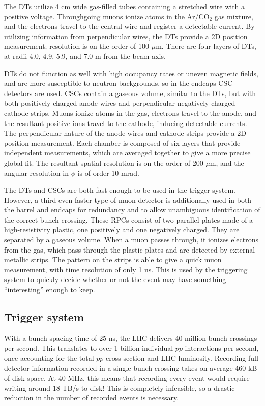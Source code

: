 The DTs utilize 4 cm wide gas-filled tubes containing a 
stretched wire with a positive voltage.
Throughgoing muons ionize atoms in the Ar/CO$_2$ gas mixture, and the electrons
travel to the central wire and register a detectable current.
By utilizing information from perpendicular wires, 
the DTs provide a 2D position measurement; resolution is on
the order of 100 $\mu$m.
There are four layers of DTs, at radii 4.0, 4.9, 5.9, and 7.0 m from
the beam axis.

DTs do not function as well with high occupancy rates or uneven magnetic fields,
and are more susceptible to neutron backgrounds, so in the endcaps
CSC detectors are used. CSCs contain a gaseous volume, similar to the DTs, but
with both positively-charged anode wires and perpendicular negatively-charged
cathode strips. Muons ionize atoms in the gas, electrons travel to the anode,
and the resultant positive ions travel to the cathode, inducing detectable currents.
The perpendicular nature of the anode wires and cathode strips provide a 2D
position measurement. Each chamber is composed of six layers that provide independent
measurements, which are averaged together to give a more precise global fit.
The resultant spatial resolution is on the order of 200 $\mu$m, and
the angular resolution in $\phi$ is of order 10 mrad.

The DTs and CSCs are both fast enough to be used in the trigger system. However,
a third even faster type of muon detector is additionally used in both the barrel and endcaps
for redundancy and to allow unambiguous identification of the correct
bunch crossing. These RPCs consist of two parallel plates made
of a high-resistivity plastic, one positively 
and one negatively charged. They are separated by a gaseous volume. When a muon passes
through, it ionizes electrons from the gas, which pass through the plastic plates
and are detected by external metallic strips. The pattern on the strips
is able to give a quick muon measurement, with time resolution of only 1 ns.
This is used by the triggering system to quickly decide whether or not 
the event may have something ``interesting'' enough to keep.

\subsection{Trigger system}

With a bunch spacing time of 25 ns, the LHC delivers 40 million
bunch crossings per second. This translates to over 1 billion individual
$pp$ interactions per second, once accounting for the total $pp$ cross section
and LHC luminosity.
Recording full detector information recorded in a single bunch crossing
takes on average 460 kB of disk space. At 40 MHz, this means that recording
every event would require writing around 18 TB/s to disk! This is completely
infeasible, so a drastic reduction in the number of recorded events is
necessary.

